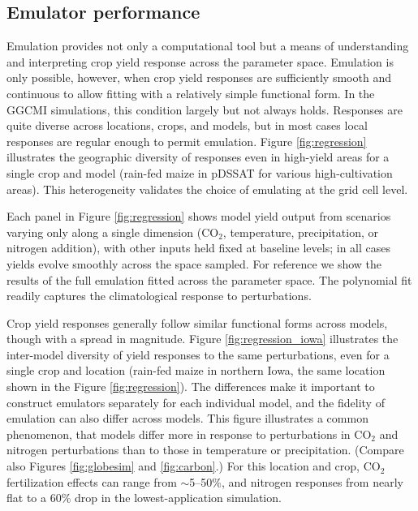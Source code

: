\documentclass[preprint, 5p, times, twocolumn]{elsarticle}
\begin{document}
\subsection{Emulator performance}
Emulation provides not only a computational tool but a means of understanding and interpreting crop yield response across the parameter space. Emulation is only possible, however, when crop yield responses are sufficiently smooth and continuous to allow fitting with a relatively simple functional form. In the GGCMI simulations, this condition largely but not always holds. Responses are quite diverse across locations, crops, and models, but in most cases local responses are regular enough to permit emulation. Figure \ref{fig:regression} illustrates the geographic diversity of responses even in high-yield areas for a single crop and model (rain-fed maize in pDSSAT for various high-cultivation areas).  This heterogeneity validates the choice of emulating at the grid cell level. 

Each panel in Figure \ref{fig:regression} shows model yield output from scenarios varying only along a single dimension (CO$_2$, temperature, precipitation, or nitrogen addition), with other inputs held fixed at baseline levels; in all cases yields evolve smoothly across the space sampled. For reference we show the results of the full emulation fitted across the parameter space. The polynomial fit readily captures the climatological response to perturbations.

Crop yield responses generally follow similar functional forms across models, though with a spread in magnitude. Figure \ref{fig:regression_iowa} illustrates the inter-model diversity of yield responses to the same perturbations, even for a single crop and location (rain-fed maize in northern Iowa, the same location shown in the Figure \ref{fig:regression}). The differences make it important to construct emulators separately for each individual model, and the fidelity of emulation can also differ across models. This figure illustrates a common phenomenon, that models differ more in response to perturbations in CO$_2$ and nitrogen perturbations than to those in temperature or precipitation. (Compare also Figures \ref{fig:globesim} and \ref{fig:carbon}.) For this location and crop, CO$_2$ fertilization effects can range from $\sim$5--50\%, and nitrogen responses from nearly flat to a 60\% drop in the lowest-application simulation. 
\end{document}
